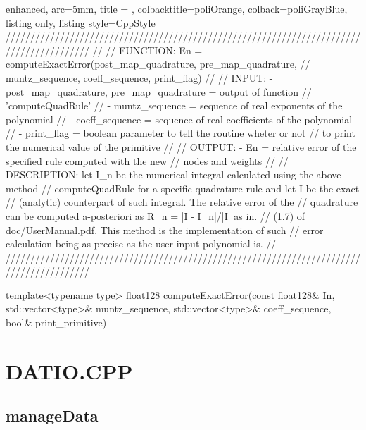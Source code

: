 \documentclass[a4paper, twosided]{book}
\begin{document}
\begin{tcblisting}{enhanced,
                   arc=5mm,
                   title = \color{black}{\large \ttfamily MonMap.cpp/computeExactError},
                   colbacktitle=poliOrange,
                   colback=poliGrayBlue,
                   listing only,
                   listing style=CppStyle}
/////////////////////////////////////////////////////////////////////////////////////////
//
//       FUNCTION: En = computeExactError({post_map_quadrature, pre_map_quadrature}, 
//                                       muntz_sequence, coeff_sequence, print_flag)
//                
//          INPUT: - {post_map_quadrature, pre_map_quadrature} = output of function
//                                                               'computeQuadRule'
//                 - muntz_sequence = sequence of real exponents of the polynomial
//                 - coeff_sequence = sequence of real coefficients of the polynomial
//                 - print_flag = boolean parameter to tell the routine wheter or not
//                                to print the numerical value of the primitive
//
//         OUTPUT: - En = relative error of the specified rule computed with the new
//                        nodes and weights
//
//    DESCRIPTION: let I_n be the numerical integral calculated using the above method
//                 computeQuadRule for a specific quadrature rule and let I be the exact
//                 (analytic) counterpart of such integral. The relative error of the 
//                 quadrature can be computed a-posteriori as R_n = |I - I_n|/|I| as in.
//                 (1.7) of doc/UserManual.pdf. This method is the implementation of such
//                 error calculation being as precise as the user-input polynomial is.
//
/////////////////////////////////////////////////////////////////////////////////////////

template<typename type>
float128 computeExactError(const float128& In, std::vector<type>& muntz_sequence, std::vector<type>& coeff_sequence, bool& print_primitive)
\end{tcblisting}

\newpage
\section[DatIo.cpp]{\changefont DATIO.CPP}\label{Sec4.2}

\subsection[manageData]{\changefont manageData}\label{SubSec4.2.1}
\end{document}
